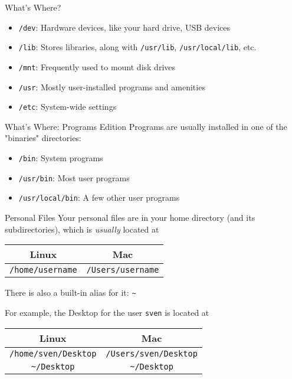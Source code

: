 \begin{frame}{What's Where?}
  \begin{itemize}[<+- | alert@+>]
    \item \texttt{/dev}: Hardware devices, like your hard drive, USB devices
    \item \texttt{/lib}: Stores libraries, along with \texttt{/usr/lib}, \texttt{/usr/local/lib}, etc.
    \item \texttt{/mnt}: Frequently used to mount disk drives
    \item \texttt{/usr}: Mostly user-installed programs and amenities
    \item \texttt{/etc}: System-wide settings
  \end{itemize}
\end{frame}

\begin{frame}{What's Where: Programs Edition}
  Programs are usually installed in one of the "binaries" directories:
  \begin{itemize}[<+- | alert@+>]
    \item \texttt{/bin}: System programs
    \item \texttt{/usr/bin}: Most user programs
    \item \texttt{/usr/local/bin}: A few other user programs
  \end{itemize}
\end{frame}

\begin{frame}[fragile]{Personal Files}
  Your personal files are in your home directory (and its subdirectories), which is \emph{usually}\tsup{*}
  located at

  \begin{center}
    \begin{tabular}{|c|c|}
      \hline
      Linux & Mac\\ \hline
      \texttt{/home/username} & \texttt{/Users/username}\\ \hline
    \end{tabular}
  \end{center}

  There is also a built-in alias for it: \texttt{\textasciitilde}

  For example, the Desktop for the user \texttt{sven} is located at

  \begin{center}
    \begin{tabular}{|c|c|}
      \hline
      Linux & Mac\\ \hline
      \texttt{/home/sven/Desktop} & \texttt{/Users/sven/Desktop}\\ \hline
      \texttt{\textasciitilde/Desktop} & \texttt{\textasciitilde/Desktop}\\ \hline
    \end{tabular}
  \end{center}
\end{frame}
%

